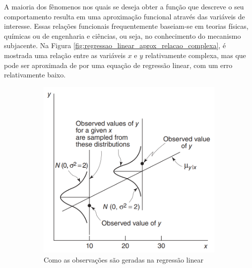 A maioria dos fênomenos nos quais se deseja obter a função que descreve o seu comportamento resulta em uma aproximação funcional através das variáveis de interesse. Essas relações funcionais frequentemente baseiam-se em teorias físicas, químicas ou de engenharia e ciências, ou seja, no conhecimento do mecanismo subjacente. Na Figura \ref{fig:regressao_linear_aprox_relacao_complexa}, é mostrada uma relação entre as variáveis $x$ e $y$ relativamente complexa, mas que pode ser aproximada de por uma equação de regressão linear, com um erro relativamente baixo.

\begin{figure}[H]
	\centering
	\caption{Interpretação de uma regressão linear}
	\begin{subfigure}{0.4\textwidth}
	  \includegraphics[width=\linewidth]{figuras/how_observations_are_generated_in_linear_regression.png}
	  \caption{Como as observações são geradas na regressão linear}
	  \label{fig:observacoes_regressao_linear}
	\end{subfigure}
	\hspace{0.5cm}
	\begin{subfigure}{0.4\textwidth} 

\end{subfigure}
\end{figure}
